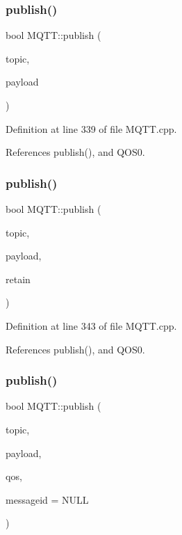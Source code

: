 \subsubsection{\texorpdfstring{publish()}{publish()}\hspace{0.1cm}{\footnotesize\ttfamily [1/10]}}
{\footnotesize\ttfamily bool M\+Q\+T\+T\+::publish (\begin{DoxyParamCaption}\item[{const char $\ast$}]{topic,  }\item[{const char $\ast$}]{payload }\end{DoxyParamCaption})}



Definition at line 339 of file M\+Q\+T\+T.\+cpp.



References publish(), and Q\+O\+S0.

\mbox{\label{class_m_q_t_t_a802136b5419b3a694ea88be27bdb9043}} 
\subsubsection{\texorpdfstring{publish()}{publish()}\hspace{0.1cm}{\footnotesize\ttfamily [2/10]}}
{\footnotesize\ttfamily bool M\+Q\+T\+T\+::publish (\begin{DoxyParamCaption}\item[{const char $\ast$}]{topic,  }\item[{const char $\ast$}]{payload,  }\item[{bool}]{retain }\end{DoxyParamCaption})}



Definition at line 343 of file M\+Q\+T\+T.\+cpp.



References publish(), and Q\+O\+S0.

\mbox{\label{class_m_q_t_t_ae9321f0f8b365eaf32c87706273cb473}} 
\subsubsection{\texorpdfstring{publish()}{publish()}\hspace{0.1cm}{\footnotesize\ttfamily [3/10]}}
{\footnotesize\ttfamily bool M\+Q\+T\+T\+::publish (\begin{DoxyParamCaption}\item[{const char $\ast$}]{topic,  }\item[{const char $\ast$}]{payload,  }\item[{\hyperlink{class_m_q_t_t_aff501e08e20ebf26b3272fcc0e7215ff}{E\+M\+Q\+T\+T\+\_\+\+Q\+OS}}]{qos,  }\item[{uint16\+\_\+t $\ast$}]{messageid = {\ttfamily NULL} }\end{DoxyParamCaption})}




